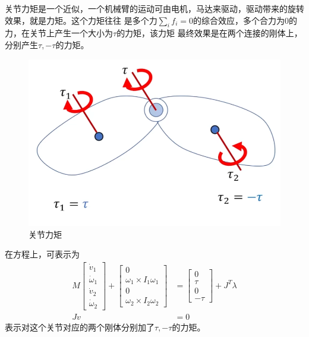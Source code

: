 \documentclass[lang=cn,newtx,10pt,scheme=chinese]{elegantbook}
\begin{document}
关节力矩是一个近似，一个机械臂的运动可由电机，马达来驱动，驱动带来的旋转效果，就是力矩。这个力矩往往
是多个力$\sum_i f_i = 0$的综合效应，多个合力为0的力，在关节上产生一个大小为$\tau$的力矩，该力矩
最终效果是在两个连接的刚体上，分别产生$\tau, -\tau$的力矩。
\begin{figure}[htbp]
  \centering
  \includegraphics[totalheight=1.5in]{"./image/taujoint.png"}
  \caption{关节力矩} \label{fig:tau joint}
\end{figure}
在方程上，可表示为
\begin{equation}
  \begin{aligned}
  M\left[\begin{array}{c}
  \dot{v}_1 \\
  \dot{\omega}_1 \\
  \dot{v}_2 \\
  \dot{\omega}_2
  \end{array}\right]+\left[\begin{array}{c}
  0 \\
  \omega_1 \times I_1 \omega_1 \\
  0 \\
  \omega_2 \times I_2 \omega_2
  \end{array}\right] & =\left[\begin{array}{c}
  0 \\
  \tau \\
  0 \\
  -\tau
  \end{array}\right]+J^T \lambda \\
  J v & =0
  \end{aligned}
\end{equation}
表示对这个关节对应的两个刚体分别加了$\tau, -\tau$的力矩。
\end{document}
